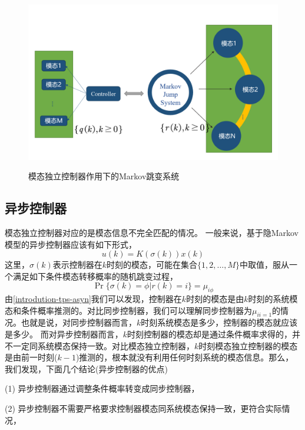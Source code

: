 	\begin{figure}[!htb] 
		\centering\includegraphics[scale=0.25]{./figures/introduction/idpsys.png}\\ 
		\caption{模态独立控制器作用下的Markov跳变系统}
		\label{intro_fig_idpsys}
	\end{figure}
	
	\subsection{异步控制器}
	模态独立控制器对应的是模态信息不完全匹配的情况。 一般来说，基于隐Markov模型的异步控制器应该有如下形式，
	\begin{equation}
	u(k)=K(\sigma(k))x(k)
	\end{equation}
	这里，$\sigma(k)$表示控制器在$k$时刻的模态，可能在集合$\{1,2,\dots,M\}$中取值，服从一个满足如下条件模态转移概率的随机跳变过程，
	\begin{equation}\label{introdution-tps-asyn}
	\Pr\{\sigma(k)=\phi|r(k)=i \}=\mu_{i\phi}
	\end{equation}
	由\eqref{introdution-tps-asyn}我们可以发现，控制器在$k$时刻的模态是由$k$时刻的系统模态和条件概率推测的。对比同步控制器，我们可以理解同步控制器为$\mu_{ii=1}$的情况。也就是说，对同步控制器而言，$k$时刻系统模态是多少，控制器的模态就应该是多少。 而对异步控制器而言，$k$时刻控制器的模态却是通过条件概率求得的，并不一定同系统模态保持一致。对比模态独立控制器，$k$时刻模态独立控制器的模态是由前一时刻($k-1$)推测的，根本就没有利用任何时刻系统的模态信息。那么，我们发现，下面几个结论(异步控制器的优点)
		
		(1) 异步控制器通过调整条件概率转变成同步控制器，
		
		(2) 异步控制器不需要严格要求控制器模态同系统模态保持一致，更符合实际情况，
		
